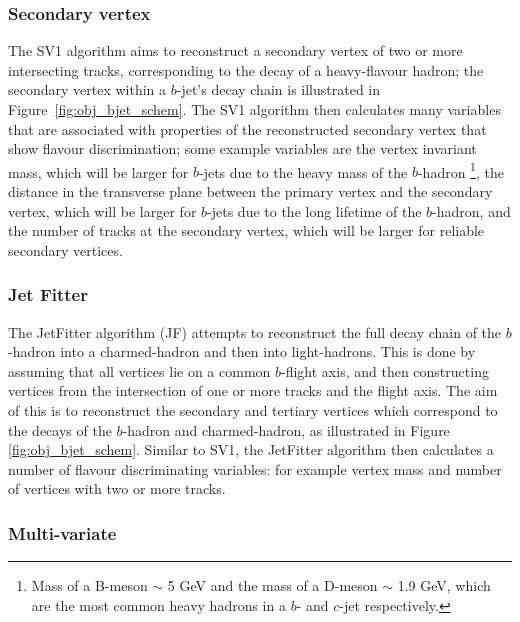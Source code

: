    \subsubsection{Secondary vertex}
   \label{sec:obj-bjets_SV}

   
   The SV1 algorithm aims to reconstruct a secondary vertex of two or more intersecting tracks, corresponding to the decay of a heavy-flavour hadron;
   the secondary vertex within a $b$-jet's decay chain is illustrated in Figure~\ref{fig:obj_bjet_schem}.
   The SV1 algorithm then calculates many variables that are associated with properties of the reconstructed secondary vertex that show flavour discrimination;
   some example variables are the vertex invariant mass,
   which will be larger for $b$-jets due to the heavy mass of the $b$-hadron
   \footnote{Mass of a B-meson $\sim$ 5 GeV and the mass of a D-meson $\sim$ 1.9 GeV, which are the most common heavy hadrons in a $b$- and $c$-jet respectively.}, 
   the distance in the transverse plane between the primary vertex and the secondary vertex, %
   which will be larger for $b$-jets due to the long lifetime of the $b$-hadron,
   and the number of tracks at the secondary vertex, which will be larger for reliable secondary vertices.
   
   \subsubsection{Jet Fitter}
   \label{sec:obj-bjets_JF}

   The JetFitter algorithm (JF) attempts to reconstruct the full decay chain of the $b$-hadron into a charmed-hadron and then into light-hadrons. 
   This is done by assuming that all vertices lie on a common $b$-flight axis, and then constructing vertices from the intersection of
   one or more tracks and the flight axis.
   The aim of this is to reconstruct the secondary and tertiary vertices which correspond to the decays of the $b$-hadron and charmed-hadron,
   as illustrated in Figure \ref{fig:obj_bjet_schem}.
   Similar to SV1, the JetFitter algorithm then calculates a number of flavour discriminating variables:
   for example vertex mass and number of vertices with two or more tracks.
   
   \subsubsection{Multi-variate}
   \label{sec:obj-bjets_MV2}

